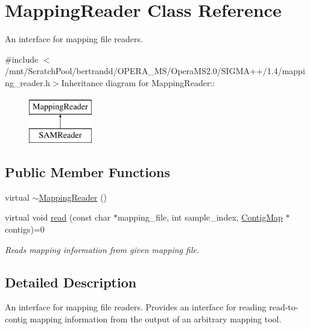 \hypertarget{classMappingReader}{
\section{MappingReader Class Reference}
\label{classMappingReader}
}


An interface for mapping file readers.  


{\ttfamily \#include $<$/mnt/ScratchPool/bertrandd/OPERA\_\-MS/OperaMS2.0/SIGMA++/1.4/mapping\_\-reader.h$>$}Inheritance diagram for MappingReader::\begin{figure}[H]
\begin{center}
\leavevmode
\includegraphics[height=2cm]{classMappingReader}
\end{center}
\end{figure}
\subsection*{Public Member Functions}
\begin{DoxyCompactItemize}
\item 
virtual \hyperlink{classMappingReader_a3bd75c996977d53880f577c4970e25ba}{$\sim$MappingReader} ()
\item 
virtual void \hyperlink{classMappingReader_ab661f4713f0f686f5476aa796d0d7585}{read} (const char $\ast$mapping\_\-file, int sample\_\-index, \hyperlink{contig_8h_aa2acb8d3b78def617ec4509a1f684c4e}{ContigMap} $\ast$contigs)=0
\begin{DoxyCompactList}\small\item\em Reads mapping information from given mapping file. \item\end{DoxyCompactList}\end{DoxyCompactItemize}


\subsection{Detailed Description}
An interface for mapping file readers. Provides an interface for reading read-\/to-\/contig mapping information from the output of an arbitrary mapping tool. 

